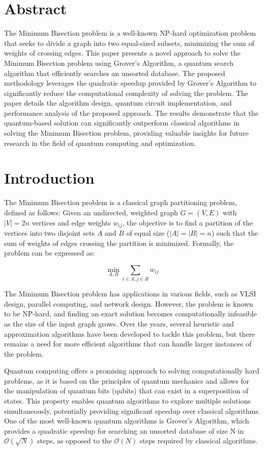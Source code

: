 \section*{Abstract}

The Minimum Bisection problem is a well-known NP-hard optimization problem that seeks to divide a graph into two equal-sized subsets, minimizing the sum of weights of crossing edges. This paper presents a novel approach to solve the Minimum Bisection problem using Grover's Algorithm, a quantum search algorithm that efficiently searches an unsorted database. The proposed methodology leverages the quadratic speedup provided by Grover's Algorithm to significantly reduce the computational complexity of solving the problem. The paper details the algorithm design, quantum circuit implementation, and performance analysis of the proposed approach. The results demonstrate that the quantum-based solution can significantly outperform classical algorithms in solving the Minimum Bisection problem, providing valuable insights for future research in the field of quantum computing and optimization.

\section{Introduction}

The Minimum Bisection problem is a classical graph partitioning problem, defined as follows: Given an undirected, weighted graph $G=(V,E)$ with $|V| = 2n$ vertices and edge weights $w_{ij}$, the objective is to find a partition of the vertices into two disjoint sets $A$ and $B$ of equal size ($|A|=|B|=n$) such that the sum of weights of edges crossing the partition is minimized. Formally, the problem can be expressed as:

\begin{equation}
\min_{A,B} \sum_{i \in A, j \in B} w_{ij}
\end{equation}

The Minimum Bisection problem has applications in various fields, such as VLSI design, parallel computing, and network design. However, the problem is known to be NP-hard, and finding an exact solution becomes computationally infeasible as the size of the input graph grows. Over the years, several heuristic and approximation algorithms have been developed to tackle this problem, but there remains a need for more efficient algorithms that can handle larger instances of the problem.

Quantum computing offers a promising approach to solving computationally hard problems, as it is based on the principles of quantum mechanics and allows for the manipulation of quantum bits (qubits) that can exist in a superposition of states. This property enables quantum algorithms to explore multiple solutions simultaneously, potentially providing significant speedup over classical algorithms. One of the most well-known quantum algorithms is Grover's Algorithm, which provides a quadratic speedup for searching an unsorted database of size N in $\mathcal{O}(\sqrt{N})$ steps, as opposed to the $\mathcal{O}(N)$ steps required by classical algorithms.

